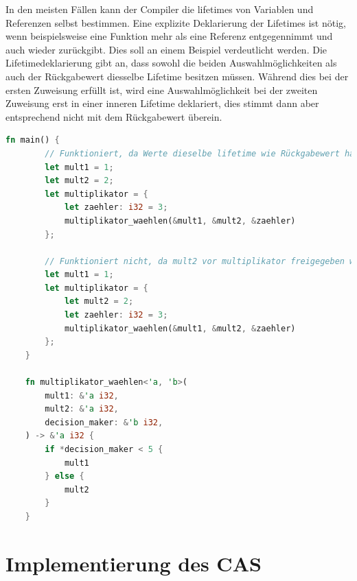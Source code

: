 \documentclass[11pt,a4paper, ngerman]{article}
\begin{document}
In den meisten Fällen kann der Compiler die lifetimes von Variablen und Referenzen selbst bestimmen. Eine explizite Deklarierung der Lifetimes ist nötig, wenn beispielsweise eine Funktion mehr als eine Referenz entgegennimmt und auch wieder zurückgibt. Dies soll an einem Beispiel verdeutlicht werden. Die Lifetimedeklarierung  gibt an, dass sowohl die beiden Auswahlmöglichkeiten als auch der Rückgabewert diesselbe Lifetime besitzen müssen. Während dies bei der ersten Zuweisung erfüllt ist, wird eine Auswahlmöglichkeit bei der zweiten Zuweisung erst in einer inneren Lifetime deklariert, dies stimmt dann aber entsprechend nicht mit dem Rückgabewert überein.

\begin{lstlisting}[language=rust, caption={lifetime Beispiele \cite{RustLifetimeEx}}]
    fn main() {
        // Funktioniert, da Werte dieselbe lifetime wie Rückgabewert haben
        let mult1 = 1;
        let mult2 = 2;
        let multiplikator = {
            let zaehler: i32 = 3;
            multiplikator_waehlen(&mult1, &mult2, &zaehler)
        };

        // Funktioniert nicht, da mult2 vor multiplikator freigegeben wird
        let mult1 = 1;
        let multiplikator = {
            let mult2 = 2;
            let zaehler: i32 = 3;
            multiplikator_waehlen(&mult1, &mult2, &zaehler)
        };
    }

    fn multiplikator_waehlen<'a, 'b>(
        mult1: &'a i32,
        mult2: &'a i32,
        decision_maker: &'b i32,
    ) -> &'a i32 {
        if *decision_maker < 5 {
            mult1
        } else {
            mult2
        }
    }
\end{lstlisting}

\newpage

\section{Implementierung des CAS}
\end{document}
